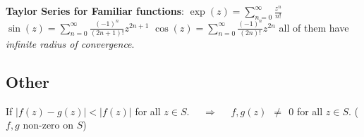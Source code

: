 \documentclass[9pt]{article}
\begin{document}
\textbf{Taylor Series for Familiar functions}: {\scriptsize $\exp(z)=\sum_{n=0}^{\infty}\frac{z^n}{n!}$ \quad $\sin(z)=\sum_{n=0}^{\infty}\frac{(-1)^n}{(2n+1)!}z^{2n+1}$ \quad $\cos(z)=\sum_{n=0}^{\infty}\frac{(-1)^n}{(2n)!}z^{2n}$ all of them have \textit{infinite radius of convergence}.}


\subsection{Other}

If $|f(z)-g(z)|<|f(z)|$ for all $z\in S$. \ \ $\Rightarrow$ \ \ $f,g(z) \ \ \ne \ \ 0$ for all $z\in S$. ($f,g$ non-zero on $S$)
\end{document}
